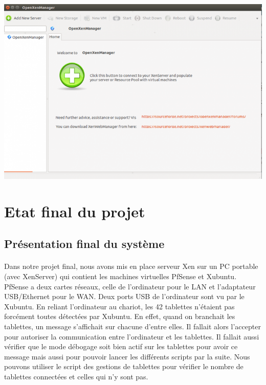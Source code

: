 \documentclass[a4paper,12pt]{extarticle}
\begin{document}
\begin{center}
\includegraphics[scale=0.70]{openxenmanager}
\end{center}

\section{Etat final du projet}
\subsection{Présentation final du système}

\paragraph{}
Dans notre projet final, nous avons mis en place serveur Xen sur un PC portable (avec XenServer) qui contient les machines virtuelles PfSense et Xubuntu. PfSense a deux cartes réseaux, celle de l’ordinateur pour le LAN et l’adaptateur USB/Ethernet pour le WAN. Deux ports USB de l’ordinateur sont vu par le Xubuntu. En reliant l’ordinateur au chariot, les 42 tablettes n’étaient pas forcément toutes détectées par Xubuntu. 
En effet, quand on branchait les tablettes, un message s’affichait sur chacune d’entre elles. Il fallait alors l’accepter pour autoriser la communication entre l’ordinateur et les tablettes. Il fallait aussi vérifier que le mode débogage soit bien actif sur les tablettes pour avoir ce message mais aussi pour pouvoir lancer les différents scripts par la suite. Nous pouvons utiliser le script des gestions de tablettes pour vérifier le nombre de tablettes connectées et celles qui n’y sont pas. \\
\end{document}
